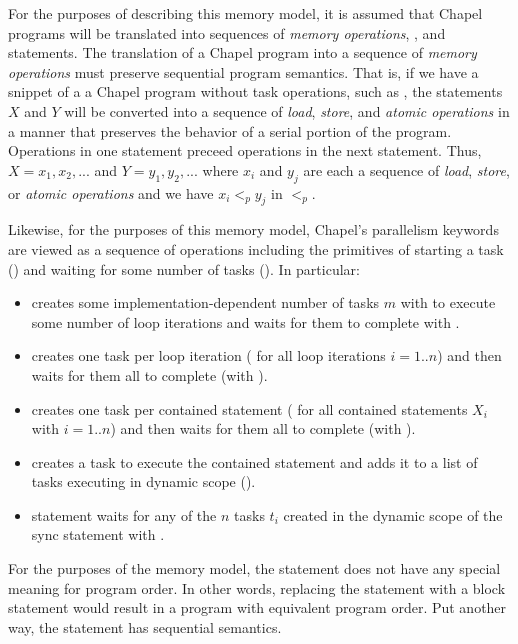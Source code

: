 For the purposes of describing this memory model, it is assumed that Chapel
programs will be translated into sequences of \textit{memory operations},
, and  statements. The translation of a Chapel program
into a sequence of \textit{memory operations} must preserve sequential program
semantics. That is, if we have a snippet of a a Chapel program without task
operations, such as , the statements $X$ and $Y$ will be converted
into a sequence of \textit{load}, \textit{store}, and \textit{atomic
operations} in a manner that preserves the behavior of a serial portion of the program. Operations
in one statement preceed operations in the next statement. Thus,
$X=x_1,x_2,...$ and $Y=y_1,y_2,...$ where $x_i$ and $y_j$ are each a sequence
of \textit{load}, \textit{store}, or \textit{atomic operations} and we have
$x_i <_p y_j$ in $<_p$.

Likewise, for the purposes of this memory model, Chapel's parallelism keywords
are viewed as a sequence of operations including the primitives of starting a
task () and waiting for some number of tasks
(). In particular:

\begin{itemize}
  \item {} creates some implementation-dependent number of tasks $m$ with  to execute some number of loop iterations and waits for them to complete with .
  \item {} creates one task per loop iteration ( for all loop iterations $i=1..n$) and then waits for them all to complete (with ).
  \item {} creates one task per contained statement ( for all contained statements $X_i$ with $i=1..n$) and then waits for them all to complete (with ).
  \item {} creates a task to execute the contained statement and adds it to a list of tasks executing in dynamic scope ().
  \item {} statement waits for any of the $n$ tasks $t_i$ created in the dynamic scope of the sync statement with .
\end{itemize}

For the purposes of the memory model, the  statement does not have any
special meaning for program order. In other words, replacing the 
statement with a block statement would result in a program with equivalent
program order. Put another way, the  statement has sequential semantics.

